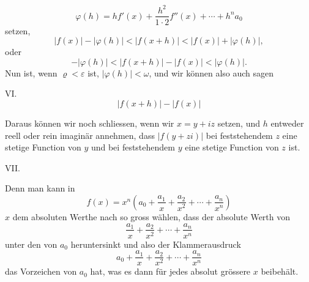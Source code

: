 
\[
 \varphi(h)=h f'(x)+\frac{h^2}{1\cdot2}f''(x)+\cdots+h^n a_0
\]
setzen,
\[
 |f(x)|-|\varphi(h)|<|f(x+h)|<|f(x)|+|\varphi(h)|,
\]
oder
\[
 -|\varphi(h)|<|f(x+h)|-|f(x)|<|\varphi(h)|.
\]
Nun ist, wenn $\varrho<\varepsilon$ ist, $|\varphi(h)|<\omega$, und wir können also auch sagen

\medskip
\noindent VI. 
\[
 |f(x+h)|-|f(x)|
\]
\medskip

Daraus können wir noch schliessen, wenn wir $x=y+iz$ setzen, und $h$ entweder reell oder rein imaginär annehmen, dass $|f(y+zi)|$ bei feststehendem $z$ eine stetige Function von $y$ und bei feststehendem $y$ eine stetige Function von $z$ ist.

\medskip
\noindent VII. 

Denn man kann in
\[
 f(x)=x^n\left(a_0+\frac{a_1}{x}+\frac{a_2}{x^2}+\cdots+\frac{a_n}{x^n}\right)
\]
$x$ dem absoluten Werthe nach so gross wählen, dass der absolute Werth von
\[
 \frac{a_1}{x}+\frac{a_2}{x^2}+\cdots+\frac{a_n}{x^n}
\]
unter den von $a_0$ heruntersinkt und also der Klammerausdruck
\[
 a_0+\frac{a_1}{x}+\frac{a_2}{x^2}+\cdots+\frac{a_n}{x^n}
\]
das Vorzeichen von $a_0$ hat, was es dann für jedes absolut grössere $x$ beibehält.
